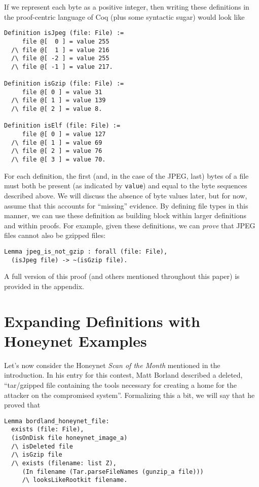\documentclass[nocopyrightspace]{sigplanconf}
\begin{document}
If we represent each byte as a positive integer, then writing these
definitions in the proof-centric language of Coq (plus some syntactic sugar)
would look like

\begin{lstlisting}
Definition isJpeg (file: File) :=
     file @[  0 ] = value 255
  /\ file @[  1 ] = value 216 
  /\ file @[ -2 ] = value 255
  /\ file @[ -1 ] = value 217.

Definition isGzip (file: File) :=
     file @[ 0 ] = value 31
  /\ file @[ 1 ] = value 139 
  /\ file @[ 2 ] = value 8.

Definition isElf (file: File) :=
     file @[ 0 ] = value 127
  /\ file @[ 1 ] = value 69 
  /\ file @[ 2 ] = value 76
  /\ file @[ 3 ] = value 70.
\end{lstlisting}

For each definition, the first (and, in the case of the JPEG, last) bytes of a
file must both be present (as indicated by {\tt value}) and equal to the byte
sequences described above. We will discuss the absence of byte values later,
but for now, assume that this accounts for ``missing'' evidence. By defining
file types in this manner, we can use these definition as building block
within larger definitions and within proofs. For example, given these
definitions, we can {\it prove} that JPEG files cannot also be gzipped files:

\begin{lstlisting}
Lemma jpeg_is_not_gzip : forall (file: File),
  (isJpeg file) -> ~(isGzip file).
\end{lstlisting}

A full version of this proof (and others mentioned throughout this paper) is
provided in the appendix.

\section{Expanding Definitions with Honeynet Examples}

Let's now consider the Honeynet {\it Scan of the Month} mentioned in the
introduction. In his entry for this contest, Matt 
Borland\cite{borland-honeynet} described a deleted, ``tar/gzipped file
containing the tools necessary for creating a home for the attacker on the
compromised system''. Formalizing this a bit, we will say that he proved that

\begin{lstlisting}
Lemma bordland_honeynet_file:
  exists (file: File),
  (isOnDisk file honeynet_image_a)
  /\ isDeleted file
  /\ isGzip file
  /\ exists (filename: list Z),
     (In filename (Tar.parseFileNames (gunzip_a file)))
     /\ looksLikeRootkit filename.
\end{lstlisting}
\end{document}
